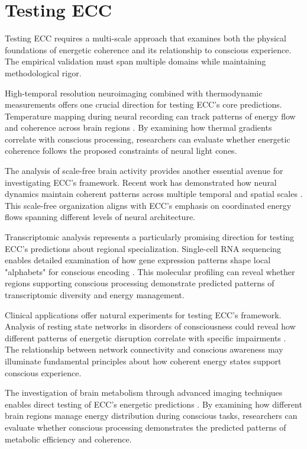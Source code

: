 \section{Testing ECC}

\begin{refsection}

Testing ECC requires a multi-scale approach that examines both the physical foundations of energetic coherence and its relationship to conscious experience. The empirical validation must span multiple domains while maintaining methodological rigor.

High-temporal resolution neuroimaging combined with thermodynamic measurements offers one crucial direction for testing ECC's core predictions. Temperature mapping during neural recording can track patterns of energy flow and coherence across brain regions \cite{Watts2018}. By examining how thermal gradients correlate with conscious processing, researchers can evaluate whether energetic coherence follows the proposed constraints of neural light cones.

The analysis of scale-free brain activity provides another essential avenue for investigating ECC's framework. Recent work has demonstrated how neural dynamics maintain coherent patterns across multiple temporal and spatial scales \cite{He2014}. This scale-free organization aligns with ECC's emphasis on coordinated energy flows spanning different levels of neural architecture.

Transcriptomic analysis represents a particularly promising direction for testing ECC's predictions about regional specialization. Single-cell RNA sequencing enables detailed examination of how gene expression patterns shape local "alphabets" for conscious encoding \cite{Gallegos2020}. This molecular profiling can reveal whether regions supporting conscious processing demonstrate predicted patterns of transcriptomic diversity and energy management.

Clinical applications offer natural experiments for testing ECC's framework. Analysis of resting state networks in disorders of consciousness could reveal how different patterns of energetic disruption correlate with specific impairments \cite{Fox2010}. The relationship between network connectivity and conscious awareness may illuminate fundamental principles about how coherent energy states support conscious experience.

The investigation of brain metabolism through advanced imaging techniques enables direct testing of ECC's energetic predictions \cite{Magistretti2018}. By examining how different brain regions manage energy distribution during conscious tasks, researchers can evaluate whether conscious processing demonstrates the predicted patterns of metabolic efficiency and coherence.


\end{refsection}
